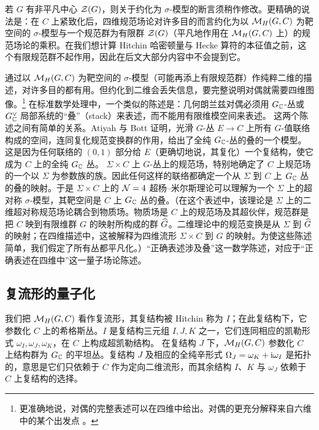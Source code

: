 若 $G$ 有非平凡中心 ${\mathcal Z}(G)$，则关于约化为 $\sigma$-模型的断言须稍作修改。更精确的说法是：在 $C$ 上紧致化后，四维规范场论对许多目的而言约化为以 ${\mathcal M}_H(G,C)$ 为靶空间的 $\sigma$-模型与一个规范群为有限群 ${\mathcal Z}(G)$（平凡地作用在 ${\mathcal M}_H(G,C)$ 上）的规范场论的乘积。在我们想计算 Hitchin 哈密顿量与 Hecke 算符的本征值之前，这个有限规范群不起作用，因此在后文大部分内容中不会提到它。

通过以 ${\mathcal M}_H(G,C)$ 为靶空间的 $\sigma$-模型（可能再添上有限规范群）作纯粹二维的描述，对许多目的都有用。但约化到二维会丢失信息，要完整说明对偶就需要四维图像。\footnote{更准确地说，对偶的完整表述可以在四维中给出。对偶的更充分解释来自六维中的某个出发点 \cite{WittenLecture}。} 在标准数学处理中，一个类似的陈述是：几何朗兰兹对偶必须用 $G_{\mathbb C}$-丛或 $G_{\mathbb C}^\vee$ 局部系统的“叠”（stack）来表述，而不能用有限维模空间来表述。 这两个陈述之间有简单的关系。Atiyah 与 Bott \cite{AB} 证明，光滑 $G$-丛 $E\to C$ 上所有 $G$-值联络构成的空间，连同复化规范变换群的作用，给出了全纯 $G_{\mathbb C}$-丛的叠的一个模型。这是因为任何联络的 $(0,1)$ 部分给 $E$（更确切地说，其复化）一个复结构，使它成为 $C$ 上的全纯 $G_{\mathbb C}$ 丛。
$\Sigma\times C$ 上 $G$-丛上的规范场，特别地确定了 $C$ 上规范场的一个以 $\Sigma$ 为参数族的族。因此任何这样的联络都确定一个从 $\Sigma$ 到 $C$ 上 $G_{\mathbb C}$ 丛的叠的映射。于是 $\Sigma\times C$ 上的 ${\mathcal N}=4$ 超杨–米尔斯理论可以理解为一个 $\Sigma$ 上的超对称 $\sigma$-模型，其靶空间是 $C$ 上 $G_{\mathbb C}$ 丛的叠。（在这个表述中，该理论是 $\Sigma$ 上的二维超对称规范场论耦合到物质场。物质场是 $C$ 上的规范场及其超伙伴，规范群是把 $C$ 映到有限维群 $G$ 的映射所构成的群 $\widehat G$。二维理论中的规范变换是从 $\Sigma$ 到 $\widehat G$ 的映射；在四维描述中，这被解释为四维流形 $\Sigma\times C$ 到 $G$ 的映射。为使这些陈述简单，我们假定了所有丛都平凡化。）“正确表述涉及叠”这一数学陈述，对应于“正确表述在四维中”这一量子场论陈述。

\subsection{复流形的量子化}\label{cm}

我们把 ${\mathcal M}_H(G,C)$ 看作复流形，其复结构被 Hitchin \cite{H} 称为 $I$；在此复结构下，它参数化 $C$ 上的希格斯丛。$I$ 是复结构三元组 $I,J,K$ 之一，它们连同相应的凯勒形式 $\omega_I,\omega_J,\omega_K$，在 $C$ 上构成超凯勒结构。 在复结构 $J$ 下，${\mathcal M}_H(G,C)$ 参数化 $C$ 上结构群为 $G_{\mathbb C}$ 的平坦丛。复结构 $J$ 及相应的全纯辛形式 $\Omega_J=\omega_K+{\mathrm i}\omega_I$ 是拓扑的，意思是它们只依赖于 $C$ 作为定向二维流形，而其余结构 $I$、$K$ 与 $\omega_J$ 依赖于 $C$ 上复结构的选择。

